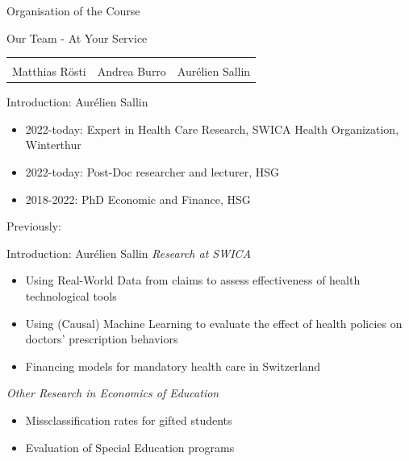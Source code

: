 \documentclass[
  ignorenonframetext,
]{beamer}
\providecommand{\tightlist}{%
  \setlength{\itemsep}{0pt}\setlength{\parskip}{0pt}}
\begin{document}
\begin{frame}{Organisation of the Course}
\protect\hypertarget{organisation-of-the-course}{}
\begin{block}{Our Team - At Your Service}
\protect\hypertarget{our-team---at-your-service}{}
\begin{longtable}[]{@{}
  >{\raggedright\arraybackslash}p{}
  >{\raggedright\arraybackslash}p{}
  >{\raggedright\arraybackslash}p{}@{}}
\toprule
\endhead
& & \\
Matthias Rösti & Andrea Burro & Aurélien Sallin \\
\bottomrule
\end{longtable}
\end{block}

\begin{block}{Introduction: Aurélien Sallin}
\protect\hypertarget{introduction-auruxe9lien-sallin}{}
\begin{itemize}
\tightlist
\item
  2022-today: Expert in Health Care Research, SWICA Health Organization,
  Winterthur
\item
  2022-today: Post-Doc researcher and lecturer, HSG
\item
  2018-2022: PhD Economic and Finance, HSG
\end{itemize}

Previously:

\end{block}

\begin{block}{Introduction: Aurélien Sallin}
\protect\hypertarget{introduction-auruxe9lien-sallin-1}{}
\emph{Research at SWICA}

\begin{itemize}
\tightlist
\item
  Using Real-World Data from claims to assess effectiveness of health
  technological tools
\item
  Using (Causal) Machine Learning to evaluate the effect of health
  policies on doctors' prescription behaviors
\item
  Financing models for mandatory health care in Switzerland
\end{itemize}

\emph{Other Research in Economics of Education}

\begin{itemize}
\tightlist
\item
  Missclassification rates for gifted students
\item
  Evaluation of Special Education programs
\end{itemize}
\end{block}
\end{frame}
\end{document}
